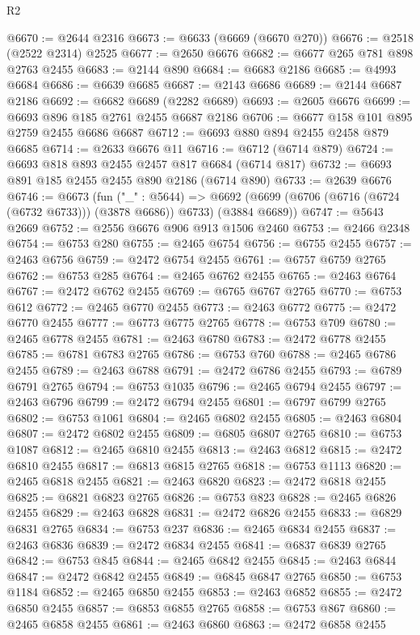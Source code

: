 \begin{lexlean}{R2}
\begin{coremodule}
@6670 := @2644 @2316
@6673 := @6633 (@6669 (@6670 @270))
@6676 := @2518 (@2522 @2314) @2525
@6677 := @2650 @6676
@6682 := @6677 @265 @781 @898 @2763 @2455
@6683 := @2144 @890
@6684 := @6683 @2186
@6685 := @4993 @6684
@6686 := @6639 @6685
@6687 := @2143 @6686
@6689 := @2144 @6687 @2186
@6692 := @6682 @6689 (@2282 @6689)
@6693 := @2605 @6676
@6699 := @6693 @896 @185 @2761 @2455 @6687 @2186
@6706 := @6677 @158 @101 @895 @2759 @2455 @6686 @6687
@6712 := @6693 @880 @894 @2455 @2458 @879 @6685
@6714 := @2633 @6676 @11
@6716 := @6712 (@6714 @879)
@6724 := @6693 @818 @893 @2455 @2457 @817 @6684 (@6714 @817)
@6732 := @6693 @891 @185 @2455 @2455 @890 @2186 (@6714 @890)
@6733 := @2639 @6676
@6746 := @6673
    (fun ("_" : @5644) =>
    @6692 (@6699 (@6706 (@6716 (@6724 (@6732 @6733))) (@3878 @6686)) @6733) (@3884 @6689))
@6747 := @5643 @2669
@6752 := @2556 @6676 @906 @913 @1506 @2460
@6753 := @2466 @2348
@6754 := @6753 @280
@6755 := @2465 @6754
@6756 := @6755 @2455
@6757 := @2463 @6756
@6759 := @2472 @6754 @2455
@6761 := @6757 @6759 @2765
@6762 := @6753 @285
@6764 := @2465 @6762 @2455
@6765 := @2463 @6764
@6767 := @2472 @6762 @2455
@6769 := @6765 @6767 @2765
@6770 := @6753 @612
@6772 := @2465 @6770 @2455
@6773 := @2463 @6772
@6775 := @2472 @6770 @2455
@6777 := @6773 @6775 @2765
@6778 := @6753 @709
@6780 := @2465 @6778 @2455
@6781 := @2463 @6780
@6783 := @2472 @6778 @2455
@6785 := @6781 @6783 @2765
@6786 := @6753 @760
@6788 := @2465 @6786 @2455
@6789 := @2463 @6788
@6791 := @2472 @6786 @2455
@6793 := @6789 @6791 @2765
@6794 := @6753 @1035
@6796 := @2465 @6794 @2455
@6797 := @2463 @6796
@6799 := @2472 @6794 @2455
@6801 := @6797 @6799 @2765
@6802 := @6753 @1061
@6804 := @2465 @6802 @2455
@6805 := @2463 @6804
@6807 := @2472 @6802 @2455
@6809 := @6805 @6807 @2765
@6810 := @6753 @1087
@6812 := @2465 @6810 @2455
@6813 := @2463 @6812
@6815 := @2472 @6810 @2455
@6817 := @6813 @6815 @2765
@6818 := @6753 @1113
@6820 := @2465 @6818 @2455
@6821 := @2463 @6820
@6823 := @2472 @6818 @2455
@6825 := @6821 @6823 @2765
@6826 := @6753 @823
@6828 := @2465 @6826 @2455
@6829 := @2463 @6828
@6831 := @2472 @6826 @2455
@6833 := @6829 @6831 @2765
@6834 := @6753 @237
@6836 := @2465 @6834 @2455
@6837 := @2463 @6836
@6839 := @2472 @6834 @2455
@6841 := @6837 @6839 @2765
@6842 := @6753 @845
@6844 := @2465 @6842 @2455
@6845 := @2463 @6844
@6847 := @2472 @6842 @2455
@6849 := @6845 @6847 @2765
@6850 := @6753 @1184
@6852 := @2465 @6850 @2455
@6853 := @2463 @6852
@6855 := @2472 @6850 @2455
@6857 := @6853 @6855 @2765
@6858 := @6753 @867
@6860 := @2465 @6858 @2455
@6861 := @2463 @6860
@6863 := @2472 @6858 @2455

\end{coremodule}
\end{lexlean}
